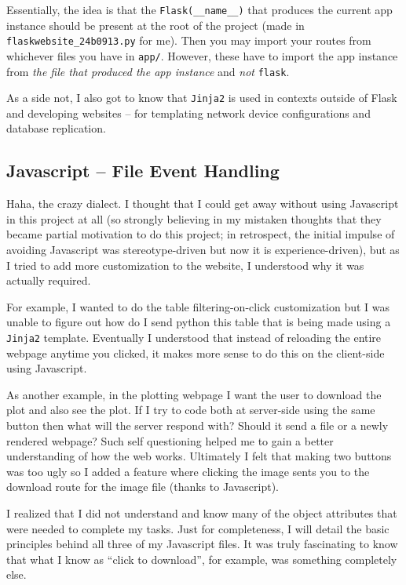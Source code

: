 \documentclass[11pt]{scrartcl}
\begin{document}
Essentially, the idea is that the \texttt{Flask(\_\_name\_\_)} that produces the
current app instance should be present at the root of the project (made
in \texttt{flaskwebsite\_24b0913.py} for me). Then you may import your
routes from whichever files you have in \texttt{app/}. However, these have to
import the app instance from \emph{the file that produced the app instance} and
\emph{not} \texttt{flask}.

As a side not, I also got to know that \texttt{Jinja2} is used in contexts outside of
Flask and developing websites -- for templating network device configurations
and database replication.

\subsection{Javascript -- File Event Handling}

Haha, the crazy dialect. I thought that I could get away without using
Javascript in this project at all (so strongly believing in my mistaken
thoughts that they became partial motivation to do this project; in retrospect,
the initial impulse of avoiding Javascript was stereotype-driven but now it is
experience-driven), but as I tried to add more customization to the website, I
understood why it was actually required. 

For example, I wanted to do the table filtering-on-click customization but I was
unable to figure out how do I send python this table that is being made using a
\texttt{Jinja2} template. Eventually I understood that instead of reloading the
entire webpage anytime you clicked, it makes more sense to do this on the
client-side using Javascript.

As another example, in the plotting webpage I want the user to download the plot
and also see the plot. If I try to code both at server-side using the same
button then what will the server respond with? Should it send a file or a newly
rendered webpage? Such self questioning helped me to gain a better understanding
of how the web works. Ultimately I felt that making two buttons was too ugly so
I added a feature where clicking the image sents you to the download route for
the image file (thanks to Javascript).

I realized that I did not understand and know many of the object attributes that
were needed to complete my tasks. Just for completeness, I will detail the basic
principles behind all three of my Javascript files. It was truly fascinating to
know that what I know as ``click to download'', for example, was something
completely else.
\end{document}
